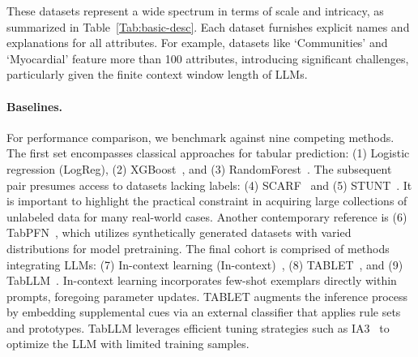 These datasets represent a wide spectrum in terms of scale and intricacy, as summarized in Table~\ref{Tab:basic-desc}.
Each dataset furnishes explicit names and explanations for all attributes. For example, datasets like `Communities' and `Myocardial' feature more than 100 attributes, introducing significant challenges, particularly given the finite context window length of LLMs.

\vspace*{-0.12in}
\paragraph{Baselines.}
For performance comparison, we benchmark against nine competing methods. The first set encompasses classical approaches for tabular prediction: (1) Logistic regression (LogReg), (2) XGBoost~\cite{chen2016xgboost}, and (3) RandomForest~\cite{ho1995random}. The subsequent pair presumes access to datasets lacking labels: (4) SCARF~\cite{bahri2022scarf} and (5) STUNT~\cite{nam2023stunt}. It is important to highlight the practical constraint in acquiring large collections of unlabeled data for many real-world cases. Another contemporary reference is (6) TabPFN~\cite{hollmann2022tabpfn}, which utilizes synthetically generated datasets with varied distributions for model pretraining. The final cohort is comprised of methods integrating LLMs: (7) In-context learning (In-context)~\cite{wei2022emergent}, (8) TABLET~\cite{slack2023tablet}, and (9) TabLLM~\cite{hegselmann2023tabllm}. In-context learning incorporates few-shot exemplars directly within prompts, foregoing parameter updates. TABLET augments the inference process by embedding supplemental cues via an external classifier that applies rule sets and prototypes. TabLLM leverages efficient tuning strategies such as IA3~\cite{liu2022few} to optimize the LLM with limited training samples.

\vspace*{-0.12in}
